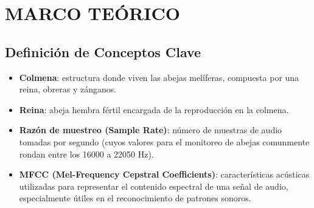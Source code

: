 \documentclass[12pt]{report}
\newenvironment{tightmulticols}{%
  \begin{multicols}{2}
  \setlength{\parskip}{0pt}
  \setlength{\parindent}{0em}
  \linespread{1}\selectfont
}{%
  \end{multicols}
}
\begin{document}
\pagebreak
\chapter{MARCO TEÓRICO}
\vspace{-3em}

\begin{tightmulticols}


\section{Definición de Conceptos Clave}

\begin{itemize}
    \item[\ding{43}] \textbf{Colmena}: estructura donde viven las abejas melíferas, compuesta por una reina, obreras y zánganos.
	\item[\ding{43}] \textbf{Reina}: abeja hembra fértil encargada de la reproducción en la colmena.
	\item[\ding{43}] \textbf{Razón de muestreo (Sample Rate)}: número de muestras de audio tomadas por segundo (cuyos valores para el monitoreo de abejas comunmente rondan entre los 16000 a 22050 Hz).
	\item[\ding{43}] \textbf{MFCC (Mel-Frequency Cepstral Coefficients)}: características acústicas utilizadas para representar el contenido espectral de una señal de audio, especialmente útiles en el reconocimiento de patrones sonoros.
\end{itemize}




\end{tightmulticols}

\end{document}
